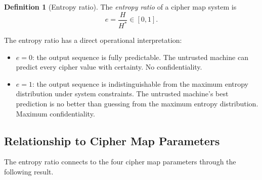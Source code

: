 \documentclass[conference]{IEEEtran}
\theoremstyle{definition}
\newtheorem{definition}{Definition}[section]
\theoremstyle{plain}
\theoremstyle{remark}
\begin{document}
\begin{definition}[Entropy ratio]
\label{def:entropy-ratio}
The \emph{entropy ratio} of a cipher map system is
\begin{equation}
\label{eq:entropy-ratio}
e = \frac{H}{H^*} \in [0, 1].
\end{equation}
\end{definition}

The entropy ratio has a direct operational interpretation:

\begin{itemize}
\item $e = 0$: the output sequence is fully predictable.  The untrusted
  machine can predict every cipher value with certainty.  No
  confidentiality.

\item $e = 1$: the output sequence is indistinguishable from the maximum
  entropy distribution under system constraints.  The untrusted machine's
  best prediction is no better than guessing from the maximum entropy
  distribution.  Maximum confidentiality.
\end{itemize}

\subsection{Relationship to Cipher Map Parameters}

The entropy ratio connects to the four cipher map parameters through the
following result.
\end{document}
